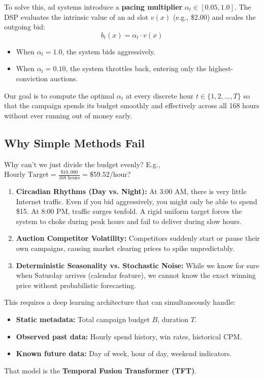 \documentclass[11pt,a4paper]{article}
\begin{document}
To solve this, ad systems introduce a \textbf{pacing multiplier} $\alpha_t \in [0.05, 1.0]$. The DSP evaluates the intrinsic value of an ad slot $v(x)$ (e.g., \$2.00) and scales the outgoing bid:
\begin{equation}
    b_t(x) = \alpha_t \cdot v(x)
\end{equation}
\begin{itemize}
    \item When $\alpha_t = 1.0$, the system bids aggressively.
    \item When $\alpha_t = 0.10$, the system throttles back, entering only the highest-conviction auctions.
\end{itemize}
Our goal is to compute the optimal $\alpha_t$ at every discrete hour $t \in \{1, 2, \dots, T\}$ so that the campaign spends its budget smoothly and effectively across all 168 hours without ever running out of money early.

\subsection{Why Simple Methods Fail}
Why can't we just divide the budget evenly? E.g., $\text{Hourly Target} = \frac{\$10,000}{168\text{ hours}} = \$59.52/\text{hour}$?
\begin{enumerate}
    \item \textbf{Circadian Rhythms (Day vs. Night):} At 3:00 AM, there is very little Internet traffic. Even if you bid aggressively, you might only be able to spend \$15. At 8:00 PM, traffic surges tenfold. A rigid uniform target forces the system to choke during peak hours and fail to deliver during slow hours.
    \item \textbf{Auction Competitor Volatility:} Competitors suddenly start or pause their own campaigns, causing market clearing prices to spike unpredictably.
    \item \textbf{Deterministic Seasonality vs. Stochastic Noise:} While we know for sure when Saturday arrives (calendar feature), we cannot know the exact winning price without probabilistic forecasting.
\end{enumerate}

This requires a deep learning architecture that can simultaneously handle:
\begin{itemize}
    \item \textbf{Static metadata:} Total campaign budget $B$, duration $T$.
    \item \textbf{Observed past data:} Hourly spend history, win rates, historical CPM.
    \item \textbf{Known future data:} Day of week, hour of day, weekend indicators.
\end{itemize}
That model is the \textbf{Temporal Fusion Transformer (TFT)}.
\end{document}
